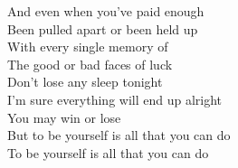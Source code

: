 And even when you've paid enough \\
Been pulled apart or been held up \\
With every single memory of \\
The good or bad faces of luck \\
Don't lose any sleep tonight \\
I'm sure everything will end up alright \\
You may win or lose \\
But to be yourself is all that you can do \\
To be yourself is all that you can do

